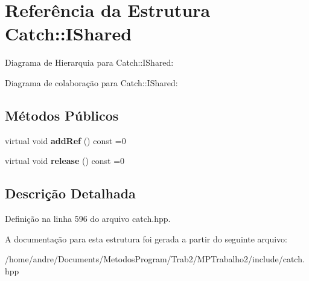 \hypertarget{structCatch_1_1IShared}{}\section{Referência da Estrutura Catch\+:\+:I\+Shared}
\label{structCatch_1_1IShared}


Diagrama de Hierarquia para Catch\+:\+:I\+Shared\+:


Diagrama de colaboração para Catch\+:\+:I\+Shared\+:
\subsection*{Métodos Públicos}
\begin{DoxyCompactItemize}
\item 
virtual void {\bfseries add\+Ref} () const =0\hypertarget{structCatch_1_1IShared_ae383df68557cdaf0910b411af04d9e33}{}\label{structCatch_1_1IShared_ae383df68557cdaf0910b411af04d9e33}

\item 
virtual void {\bfseries release} () const =0\hypertarget{structCatch_1_1IShared_a002f52624728a763956fb6f230cb2f57}{}\label{structCatch_1_1IShared_a002f52624728a763956fb6f230cb2f57}

\end{DoxyCompactItemize}


\subsection{Descrição Detalhada}


Definição na linha 596 do arquivo catch.\+hpp.



A documentação para esta estrutura foi gerada a partir do seguinte arquivo\+:\begin{DoxyCompactItemize}
\item 
/home/andre/\+Documents/\+Metodos\+Program/\+Trab2/\+M\+P\+Trabalho2/include/catch.\+hpp\end{DoxyCompactItemize}
